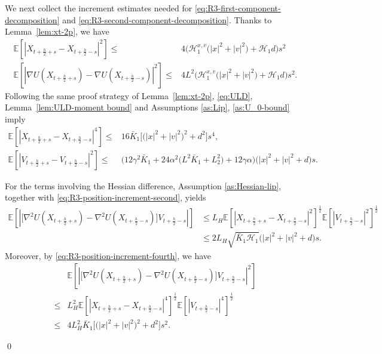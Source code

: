 \documentclass[12pt]{article}
\newenvironment{redtext}
  {\color{black}\ignorespaces}
  {\ignorespacesafterend}
\numberwithin{equation}{section}
\renewenvironment{proof}%
  {\begin{trivlist}%
   \item[]\ignorespaces}%
  {\qed\end{trivlist}}
\newcommand{\E}{\mathbb{E}}
\begin{document}
\begin{redtext}
\begin{proof}
We next collect the increment estimates needed for
\eqref{eq:R3-first-component-decomposition} and
\eqref{eq:R3-second-component-decomposition}.
Thanks to Lemma~\ref{lem:xt-2p}, we have
\begin{align}
\E
\left[
\left|
X_{t+\frac h2+s}
-
X_{t+\frac h2-s}
\right|^2
\right]
\leq&
4\Big(
\mathscr H^{x,v}_1
\big(
|x |^2 
+
|v |^2
\big)
+
\mathscr H_1
d
\Big)
s^2
\label{eq:R3-position-increment-second}
\\
\E
\left[
\left|
\nabla U(X_{t+\frac h2+s})
-
\nabla U(X_{t+\frac h2-s})
\right|^2
\right]
\leq&
4L^2\Big(
\mathscr H^{x,v}_1
\big(
|x |^2 
+
|v |^2
\big)
+
\mathscr H_1
d
\Big)
s^2.
\label{eq:R3-gradient-increment}
\end{align}
Following the same proof strategy of Lemma~\ref{lem:xt-2p}, \eqref{eq:ULD}, Lemma~\ref{lem:ULD-moment bound} and  Assumptions \ref{as:Lip}, \ref{as:U_0-bound} imply
\begin{align}
\E
\left[
\left|
X_{t+\frac h2+s}
-
X_{t+\frac h2-s}
\right|^4
\right]
\leq&
16\bar K_1
\Big[
\bigl(
|x|^2+|v|^2
\bigr)^2
+
d^2
\Big]s^4,
\label{eq:R3-position-increment-fourth}
\\
\E
\left[
\left|
V_{t+\frac h2+s}
-
V_{t+\frac h2-s}
\right|^2
\right]
\leq&
\Big(
12\gamma^2\bar K_1
+
24\alpha^2
\bigl(
L^2\bar K_1+L_2^2
\bigr)
+
12\gamma\alpha
\Big)
\bigl(
|x|^2+|v|^2+d
\bigr)s.
\label{eq:R3-velocity-increment-second}
\end{align}

For the terms involving the Hessian difference, 
Assumption \ref{as:Hessian-lip}, together with
\eqref{eq:R3-position-increment-second}, yields
\begin{align}
\E
\left[
\left|
\Big[
\nabla^2U(X_{t+\frac h2+s})
-
\nabla^2U(X_{t+\frac h2-s})
\Big]
V_{t+\frac h2-s}
\right|
\right]
&
\leq
L_H
\E
\left[
\left|
X_{t+\frac h2+s}
-
X_{t+\frac h2-s}
\right|^2
\right]^{\frac12}
\E
\left[
|V_{t+\frac h2-s}|^2
\right]^{\frac12}
\nonumber\\
&
\leq
2L_H
\sqrt{
\bar K_1\mathscr H_1
}
\bigl(
|x|^2+|v|^2+d
\bigr)s.
\label{eq:R3-Hessian-increment-first}
\end{align}
Moreover, by \eqref{eq:R3-position-increment-fourth}, we have
\begin{align}
&\E
\left[
\left|
\Big[
\nabla^2U(X_{t+\frac h2+s})
-
\nabla^2U(X_{t+\frac h2-s})
\Big]
V_{t+\frac h2-s}
\right|^2
\right]
\nonumber\\
\leq&
L_H^2
\E
\left[
\left|
X_{t+\frac h2+s}
-
X_{t+\frac h2-s}
\right|^4
\right]^{\frac12}
\E
\left[
|V_{t+\frac h2-s}|^4
\right]^{\frac12}
\\ 
\leq  &
4L_H^2\bar K_1
\Big[
\bigl(
|x|^2+|v|^2
\bigr)^2
+
d^2
\Big]s^2.
\label{eq:R3-Hessian-increment-second}
\end{align}


\end{proof}
\end{redtext}
\end{document}
